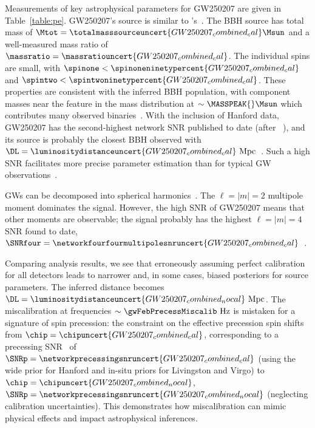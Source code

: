Measurements of key astrophysical parameters for \ac{GW250207} are given in Table~\ref{table:pe}.
\ac{GW250207}'s source is similar to 's~\cite{TheLIGOScientific:2016wfe,LIGOScientific:2021usb}.
The \ac{BBH} source has total mass of $\Mtot = {\totalmasssourceuncert{GW250207_combined_cal} \Msun}$ and a well-measured mass ratio of $\massratio = {\massratiouncert{GW250207_combined_cal}}$.
The individual spins are small, with $\spinone < {\spinoneninetypercent{GW250207_combined_cal}}$ and $\spintwo < {\spintwoninetypercent{GW250207_combined_cal}}$.
These properties are consistent with the inferred \ac{BBH} population, with component masses near the feature in the mass distribution at $\sim \MASSPEAK{}\Msun$ which contributes many observed binaries~\cite{Abbott:2020gyp,LIGOScientific:2025pvj}.
With the inclusion of Hanford data, \ac{GW250207} has the second-highest network \ac{SNR} published to date (after ~\cite{KAGRA:2025oiz}), and its source is probably the closest \ac{BBH} observed with $\DL = {\luminositydistanceuncert{GW250207_combined_cal}~\mathrm{Mpc}}$~\cite{LIGOScientific:2021usb,KAGRA:2021vkt,LIGOScientific:2025slb,LIGOScientific:2025brd}.
Such a high \ac{SNR} facilitates more precise parameter estimation than for typical \ac{GW} observations~\cite{Cutler:1994ys,LIGOScientific:2025slb}.

\acp{GW} can be decomposed into spherical harmonics~\cite{Thorne:1980ru,Blanchet:2013haa,LIGOScientific:2020stg,Mills:2020thr}.
The $\ell = |m| = 2$ multipole moment dominates the signal.
However, the high \ac{SNR} of \ac{GW250207} means that other moments are observable; the signal probably has the highest $\ell = |m| = 4$ \ac{SNR} found to date, $\SNRfour = {\networkfourfourmultipolesnruncert{GW250207_combined_cal}}$~\cite{LIGOScientific:2025cmm,LIGOScientific:2025slb,KAGRA:2025oiz}.

Comparing analysis results, we see that erroneously assuming perfect calibration for all detectors leads to narrower and, in some cases, biased posteriors for source parameters.
The inferred distance becomes $\DL = {\luminositydistanceuncert{GW250207_combined_nocal}~\mathrm{Mpc}}$.
The miscalibration at frequencies $\sim \gwFebPrecessMiscalib~\mathrm{Hz}$ is mistaken for a signature of spin precession: the constraint on the effective precession spin shifts from $\chip = {\chipuncert{GW250207_combined_cal}}$, corresponding to a precessing \ac{SNR}~\cite{Fairhurst:2019vut, Fairhurst:2019srr} of $\SNRp = {\networkprecessingsnruncert{GW250207_combined_cal}}$ (using the wide prior for Hanford and in-situ priors for Livingston and Virgo) to $\chip = {\chipuncert{GW250207_combined_nocal}}$, $\SNRp = {\networkprecessingsnruncert{GW250207_combined_nocal}}$ (neglecting calibration uncertainties).
This demonstrates how miscalibration can mimic physical effects and impact astrophysical inferences.

